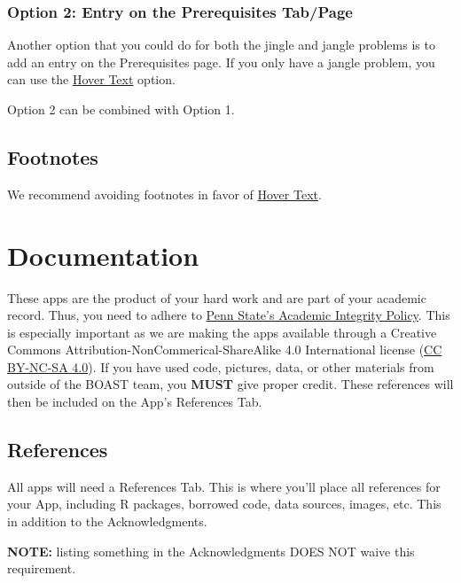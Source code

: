 \documentclass[
]{book}
\begin{document}
\hypertarget{option-2-entry-on-the-prerequisites-tabpage}{%
\subsection{Option 2: Entry on the Prerequisites Tab/Page}\label{option-2-entry-on-the-prerequisites-tabpage}}

Another option that you could do for both the jingle and jangle problems is to add an entry on the Prerequisites page. If you only have a jangle problem, you can use the \protect\hyperlink{hovertext}{Hover Text} option.

Option 2 can be combined with Option 1.

\hypertarget{footnotes}{%
\section{Footnotes}\label{footnotes}}

We recommend avoiding footnotes in favor of \protect\hyperlink{hovertext}{Hover Text}.

\hypertarget{documentation}{%
\chapter{Documentation}\label{documentation}}

These apps are the product of your hard work and are part of your academic record. Thus, you need to adhere to \href{https://undergrad.psu.edu/aappm/G-9-academic-integrity.html}{Penn State's Academic Integrity Policy}. This is especially important as we are making the apps available through a Creative Commons Attribution-NonCommerical-ShareAlike 4.0 International license (\href{https://creativecommons.org/licenses/by-nc-sa/4.0/}{CC BY-NC-SA 4.0}). If you have used code, pictures, data, or other materials from outside of the BOAST team, you \textbf{MUST} give proper credit. These references will then be included on the App's References Tab.

\hypertarget{references}{%
\section{References}\label{references}}

All apps will need a References Tab. This is where you'll place all references for your App, including R packages, borrowed code, data sources, images, etc. This in addition to the Acknowledgments.

\textbf{NOTE:} listing something in the Acknowledgments DOES NOT waive this requirement.
\end{document}
